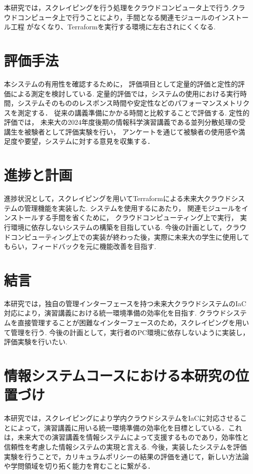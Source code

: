 \documentclass[11pt]{ujarticle}\sloppy
\begin{document}
本研究では，スクレイピングを行う処理をクラウドコンピュータ上で行う.クラウドコンピュータ上で行うことにより，手間となる関連モジュールのインストール工程
がなくなり、Terraformを実行する環境に左右されにくくなる.



\section{評価手法}

本システムの有用性を確認するために，
評価項目として定量的評価と定性的評価による測定を検討している.
定量的評価では，システムの使用における実行時間，システムそのもののレスポンス時間や安定性などのパフォーマンスメトリクスを測定する．
従来の講義準備にかかる時間と比較することで評価する.
定性的評価では，
未来大の2024年度後期の情報科学演習講義である並列分散処理の受講生を被験者として評価実験を行い，
アンケートを通じて被験者の使用感や満足度や要望，システムに対する意見を収集する．



\section{進捗と計画}

進捗状況として，スクレイピングを用いてTerraformによる未来大クラウドシステムの管理機能を実装した.
システムを使用するにあたり，
関連モジュールをインストールする手間を省くために，
クラウドコンピューティング上で実行，
実行環境に依存しないシステムの構築を目指している.
今後の計画として，クラウドコンピューティング上での実装が終わった後，実際に未来大の学生に使用してもらい，フィードバックを元に機能改善を目指す.


\section{結言}

本研究では，独自の管理インターフェースを持つ未来大クラウドシステムのIaC対応により，演習講義における統一環境準備の効率化を目指す.
クラウドシステムを直接管理することが困難なインターフェースのため，スクレイピングを用いて管理を行う.
今後の計画として，実行者のPC環境に依存しないように実装し，評価実験を行いたい.


\section{情報システムコースにおける本研究の位置づけ}

本研究では，スクレイピングにより学内クラウドシステムをIaCに対応させることによって，演習講義に用いる統一環境準備の効率化を目標としている．これは，未来大での演習講義を情報システムによって支援するものであり，効率性と信頼性を考慮した情報システムの実現と言える.
今後，実装したシステムを評価実験を行うことで，カリキュラムポリシーの結果の評価を通じて，新しい方法論や学問領域を切り拓く能力を育むことに繋がる．
\end{document}

